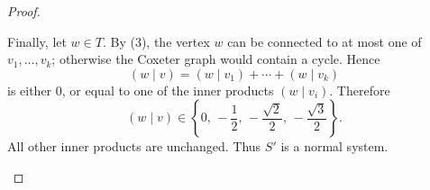 \begin{proof}
\begin{enumerate}
              Finally, let \(w\in T\). By \textup{(3)}, the vertex \(w\) can be connected
              to at most one of \(v_1,\dots,v_k\); otherwise the Coxeter graph would
              contain a cycle. Hence
              \[
                  (w\mid v)
                  =
                  (w\mid v_1)+\cdots+(w\mid v_k)
              \]
              is either \(0\), or equal to one of the inner products \((w\mid v_i)\).
              Therefore
              \[
                  (w\mid v)
                  \in
                  \left\{
                  0,\,
                  -\frac{1}{2},\,
                  -\frac{\sqrt{2}}{2},\,
                  -\frac{\sqrt{3}}{2}
                  \right\}.
              \]
              All other inner products are unchanged. Thus \(S'\) is a normal system.
    \end{enumerate}
\end{proof}

